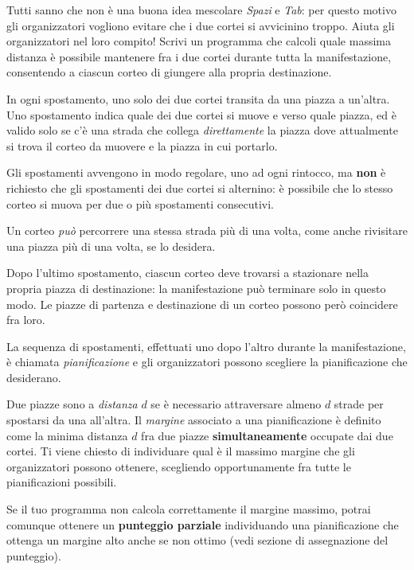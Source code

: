 Tutti sanno che non è una buona idea mescolare \emph{Spazi} e \emph{Tab}:
per questo motivo gli organizzatori vogliono evitare che i due cortei si avvicinino troppo.
Aiuta gli organizzatori nel loro compito!
Scrivi un programma che calcoli quale massima distanza
è possibile mantenere fra i due cortei durante tutta la manifestazione,
consentendo a ciascun corteo di giungere alla propria destinazione.



\begin{mdframed}[backgroundcolor=black!10,rightline=false,leftline=false]

\Specs

\small

In ogni spostamento, uno solo dei due cortei transita da una piazza a un'altra.
Uno spostamento indica quale dei due cortei si muove e verso quale piazza, ed è valido solo se c'è una strada che collega \emph{direttamente} la piazza dove attualmente si trova il corteo da muovere e la piazza in cui portarlo.

Gli spostamenti avvengono in modo regolare, uno ad ogni rintocco, ma \textbf{non} è richiesto che gli spostamenti dei due cortei si alternino:
è possibile che lo stesso corteo si muova per due o più spostamenti consecutivi.

Un corteo \emph{può} percorrere una stessa strada più di una volta,
come anche rivisitare una piazza più di una volta, se lo desidera.

Dopo l'ultimo spostamento, ciascun corteo deve trovarsi a stazionare nella propria piazza di destinazione:
la manifestazione può terminare solo in questo modo. Le piazze di partenza e destinazione di un corteo possono però coincidere fra loro.

La sequenza di spostamenti, effettuati uno dopo l'altro durante la manifestazione,
è chiamata \emph{pianificazione} e gli organizzatori possono scegliere la pianificazione che desiderano.

Due piazze sono a \emph{distanza} $d$ se è necessario attraversare almeno $d$ strade per spostarsi da una all'altra.
Il \emph{margine} associato a una pianificazione è definito come la minima distanza $d$
fra due piazze \textbf{simultaneamente} occupate dai due cortei.
Ti viene chiesto di individuare qual è il massimo margine che gli organizzatori
possono ottenere, scegliendo opportunamente fra tutte le pianificazioni possibili.

Se il tuo programma non calcola correttamente il margine massimo, potrai comunque ottenere un \textbf{punteggio parziale}
individuando una pianificazione che ottenga un margine alto anche se non ottimo (vedi sezione di assegnazione del punteggio).

\end{mdframed}

